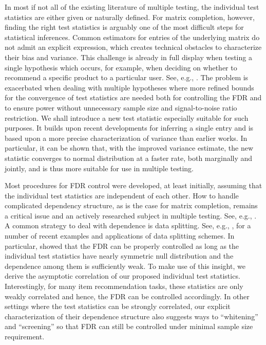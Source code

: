 \documentclass[12pt]{article}
\theoremstyle{plain}
\begin{document}
\begin{sloppypar}
In most if not all of the existing literature of multiple testing, the individual test statistics are either given or naturally defined. For matrix completion, however, finding the right test statistics is arguably one of the most difficult steps for statistical inferences. Common estimators for entries of the underlying matrix do not admit an explicit expression, which creates technical obstacles to characterize their bias and variance. This challenge is already in full display when testing a single hypothesis which occurs, for example, when deciding on whether to recommend a specific product to a particular user. See, e.g., \cite{chen2019inference, xia2021statistical,farias2022uncertainty,chen2023statistical,gui2023conformalized, shao2023distribution}. The problem is exacerbated when dealing with multiple hypotheses where more refined bounds for the convergence of test statistics are needed both for controlling the FDR and to ensure power without unnecessary sample size and signal-to-noise ratio restriction. We shall introduce a new test statistic especially suitable for such purposes. It builds upon recent developments \citep[e.g.,][]{chen2019inference,xia2021statistical} for inferring a single entry and is based upon a more precise characterization of variance than earlier works. In particular, it can be shown that, with the improved variance estimate, the new statistic converges to normal distribution at a faster rate, both marginally and jointly, and is thus more suitable for use in multiple testing.

Most procedures for FDR control were developed, at least initially, assuming that the individual test statistics are independent of each other. How to handle complicated dependency structure, as is the case for matrix completion, remains a critical issue and an actively researched subject in multiple testing. See, e.g., \cite{efron2007correlation, leek2008general, fan2017estimation, li2017rate, du2021false, fithian2022conditional}. A common strategy to deal with dependence is data splitting. See, e.g., \cite{roeder2009genome, song2015split, barber2019knockoff, zou2020new, du2021false, dai2022false, dai2023scale}, for a number of recent examples and applications of data splitting schemes. In particular, \cite{du2021false} showed that the FDR can be properly controlled as long as the individual test statistics have nearly symmetric null distribution and the dependence among them is sufficiently weak. To make use of this insight, we derive the asymptotic correlation of our proposed individual test statistics. Interestingly, for many item recommendation tasks, these statistics are only weakly correlated and hence, the FDR can be controlled accordingly. In other settings where the test statistics can be strongly correlated, our explicit characterization of their dependence structure also suggests ways to ``whitening'' and ``screening'' so that FDR can still be controlled under minimal sample size requirement.


\end{sloppypar}
\end{document}
